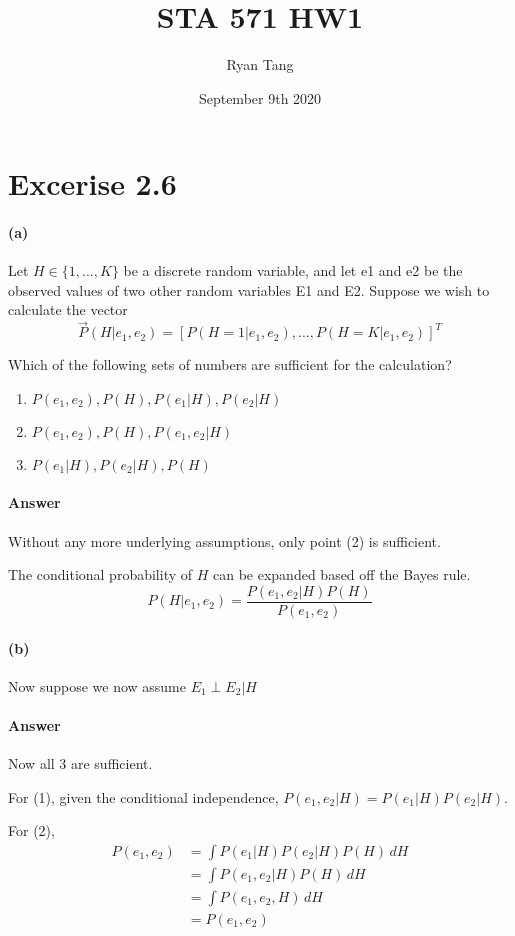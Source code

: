 \documentclass[12pt, letterpaper]{article}
\title{STA 571 HW1}
\author{Ryan Tang}
\date{September 9th 2020}
\begin{document}
\maketitle

\section{Excerise 2.6}
\paragraph{(a)}
Let $H \in \{1, . . . , K\}$ be a discrete random variable, and let e1 and e2 be the observed values of two 
other random variables E1 and E2. Suppose we wish to calculate the vector
\[
    \vec{P}(H|e_1, e_2) = [P(H = 1|e_1, e_2), . . . , P (H = K|e_1, e_2)]^T
\]

Which of the following sets of numbers are sufficient for the calculation?
\begin{enumerate}
    \item $P(e_1, e_2), P(H), P(e_1|H), P(e_2|H)$
    \item $P(e_1, e_2), P(H), P(e_1, e_2|H)$
    \item $P(e_1|H), P(e_2|H), P(H)$
\end{enumerate}

\paragraph{Answer}
Without any more underlying assumptions, only point (2) is sufficient.

The conditional probability of $H$ can be expanded based off the Bayes rule.
\[
    P(H|e_1, e_2) = \frac{P(e_1, e_2 | H)P(H)} {P(e_1, e_2)}
\]


\paragraph{(b)}
Now suppose we now assume $E_1 \perp E_2|H$

\paragraph{Answer}
Now all 3 are sufficient.

For (1), given the conditional independence, $P(e_1, e_2|H) = P(e_1|H) P(e_2|H)$.

For (2),
\begin{align*}
    P(e_1, e_2) &= \int P(e_1|H)P(e_2|H)P(H) \, dH \\
                &= \int P(e_1, e_2|H)P(H) \, dH \\
                &= \int P(e_1, e_2, H) \, dH \\
                &= P(e_1, e_2)
\end{align*}
\end{document}
